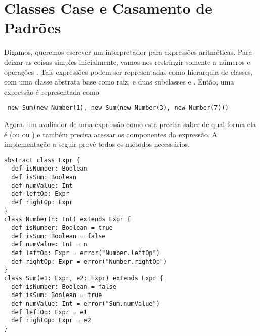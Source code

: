 \chapter{Classes Case e Casamento de Padr\~{o}es}
Digamos, queremos escrever um interpretador para express\~{o}es aritm\'{e}ticas. Para 
deixar as coisas simples inicialmente, vamos nos restringir somente a n\'{u}meros e opera\c{c}\~{o}es \code{+}.
Tais express\~{o}es podem ser representadas como hierarquia de classes, 
com uma classe abstrata base  como raiz, e duas subclasses  e .
Ent\~{a}o, uma express\~{a}o  \'{e} representada como 
 \begin{lstlisting}
 new Sum(new Number(1), new Sum(new Number(3), new Number(7)))
 \end{lstlisting}

Agora, um avaliador de uma express\~{a}o como esta precisa saber de 
qual forma ela \'{e} (ou  ou ) e tamb\'{e}m precisa
acessar os componentes da express\~{a}o. A implementa\c{c}\~{a}o a seguir prov\^{e}
todos os m\'{e}todos necess\'{a}rios.
\begin{lstlisting}
abstract class Expr {
  def isNumber: Boolean
  def isSum: Boolean
  def numValue: Int
  def leftOp: Expr
  def rightOp: Expr
}
class Number(n: Int) extends Expr {
  def isNumber: Boolean = true
  def isSum: Boolean = false
  def numValue: Int = n
  def leftOp: Expr = error("Number.leftOp")
  def rightOp: Expr = error("Number.rightOp")
}
class Sum(e1: Expr, e2: Expr) extends Expr {
  def isNumber: Boolean = false
  def isSum: Boolean = true
  def numValue: Int = error("Sum.numValue")
  def leftOp: Expr = e1
  def rightOp: Expr = e2
}
\end{lstlisting}

